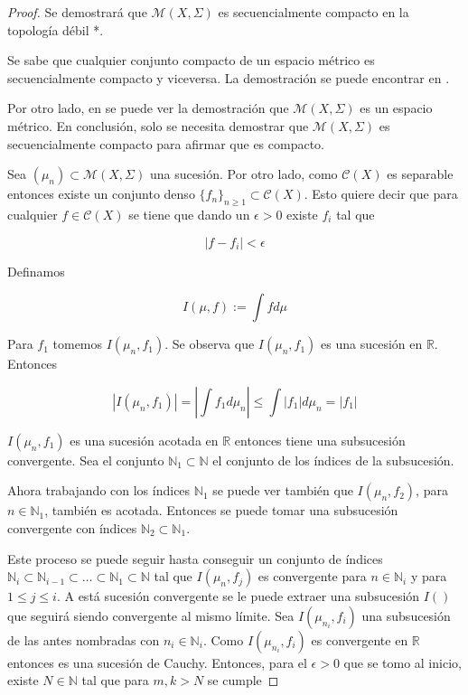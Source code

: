 \begin{proof}
	Se demostrará que $\mathcal{M}(X,\Sigma)$ es secuencialmente compacto en la topología débil *.
	
	Se sabe que cualquier conjunto compacto de un espacio métrico es secuencialmente compacto y viceversa. La demostración se puede encontrar en \cite{schep}.
	
	Por otro lado, en \cite{walkden} se puede ver la demostración que $\mathcal{M}(X,\Sigma)$ es un espacio métrico. En conclusión, solo se necesita demostrar que $\mathcal{M}(X,\Sigma)$ es secuencialmente compacto para afirmar que es compacto.
	
	Sea $(\mu_n) \subset \mathcal{M}(X,\Sigma)$ una sucesión. Por otro lado, como $\mathcal{C}(X)$ es separable entonces existe un conjunto denso $\{f_n\}_{n \geq 1} \subset \mathcal{C}(X)$. Esto quiere decir que para cualquier $f \in \mathcal{C}(X)$ se tiene que dando un $\epsilon > 0$ existe $f_i$ tal que
	
	\begin{equation}
		|f - f_i| < \epsilon
	\end{equation}
	
	Definamos
	
	\begin{equation}
		I(\mu,f) := \int f d\mu
	\end{equation}
	
	Para $f_1$ tomemos $I(\mu_n,f_1)$. Se observa que $I(\mu_n,f_1)$ es una sucesión en $\mathbb{R}$. Entonces
	
	\begin{equation}
		|I(\mu_n,f_1)| = \left| \int f_1 d\mu_n \right| \leq \int |f_1| d\mu_n = |f_1|
	\end{equation} 
	
	$I(\mu_n,f_1)$ es una sucesión acotada en $\mathbb{R}$ entonces tiene una subsucesión convergente. Sea el conjunto $\mathbb{N}_1 \subset \mathbb{N}$ el conjunto de los índices de la subsucesión. 
	
	Ahora trabajando con los índices $\mathbb{N}_1$ se puede ver también que $I(\mu_n,f_2)$, para $n \in \mathbb{N}_1$, también es acotada. Entonces se puede tomar una subsucesión convergente con índices $\mathbb{N}_2 \subset \mathbb{N}_1$.
	
	Este proceso se puede seguir hasta conseguir un conjunto de índices $\mathbb{N}_i \subset \mathbb{N}_{i-1} \subset \ldots \subset \mathbb{N}_1 \subset \mathbb{N}$ tal que $I(\mu_n,f_j)$ es convergente para $n \in \mathbb{N}_i$ y para $1 \leq j \leq i$. A está sucesión convergente se le puede extraer una subsucesión $I()$ que seguirá siendo convergente al mismo límite. Sea $I(\mu_{n_i},f_i)$ una subsucesión de las antes nombradas con $n_i \in \mathbb{N}_i$. Como $I(\mu_{n_i},f_i)$ es convergente en $\mathbb{R}$ entonces es una sucesión de Cauchy. Entonces, para el $\epsilon > 0$ que se tomo al inicio, existe $N \in \mathbb{N}$ tal que para $m,k > N$ se cumple
		

\end{proof}
